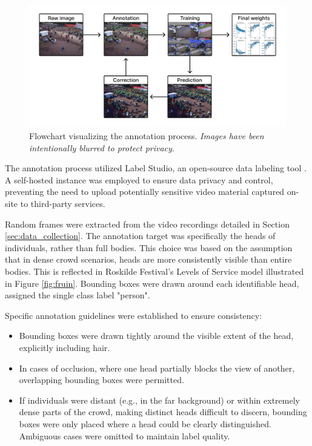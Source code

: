 \begin{figure}[ht!]
  \centering
  \includegraphics[width=\textwidth]{Pictures/Figures/annotation_flowchart.png}
  \caption{Flowchart visualizing the annotation process. \textit{Images have been intentionally blurred to protect privacy}.}
  \label{fig:annotation_flowchart}
\end{figure}

The annotation process utilized Label Studio, an open-source data labeling tool \cite{label_studio}. A self-hosted instance was employed to ensure data privacy and control, preventing the need to upload potentially sensitive video material captured on-site to third-party services.

Random frames were extracted from the video recordings detailed in Section \ref{sec:data_collection}. The annotation target was specifically the heads of individuals, rather than full bodies. This choice was based on the assumption that in dense crowd scenarios, heads are more consistently visible than entire bodies. This is reflected in Roskilde Festival's Levels of Service model illustrated in Figure \ref{fig:fruin}. Bounding boxes were drawn around each identifiable head, assigned the single class label "person".

Specific annotation guidelines were established to ensure consistency:
\begin{itemize}
  \item Bounding boxes were drawn tightly around the visible extent of the head, explicitly including hair.
  \item In cases of occlusion, where one head partially blocks the view of another, overlapping bounding boxes were permitted.
  \item If individuals were distant (e.g., in the far background) or within extremely dense parts of the crowd, making distinct heads difficult to discern, bounding boxes were only placed where a head could be clearly distinguished. Ambiguous cases were omitted to maintain label quality.
\end{itemize}

